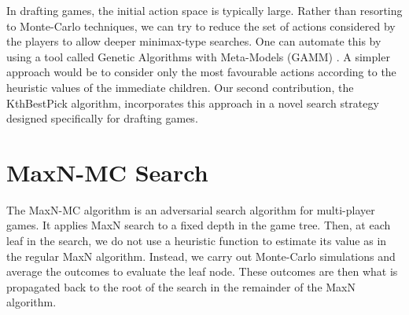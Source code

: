 \documentclass[letterpaper]{article}
\numberwithin{equation}{section}
\numberwithin{theorem}{section}
\numberwithin{lemma}{section}
\numberwithin{df}{section}
\begin{document}

In drafting games, the initial action space is typically large.  Rather than resorting to Monte-Carlo techniques, we can try to reduce the set of actions considered by the players to allow deeper minimax-type searches.  One can automate this by using a tool called Genetic Algorithms with Meta-Models (GAMM) \cite{GAMM}.  A simpler approach would be to consider only the most favourable actions according to the heuristic values of the immediate children.  Our second contribution, the KthBestPick algorithm, incorporates this approach in a novel search strategy designed specifically for drafting games.
 

%


\section{MaxN-MC Search}


The MaxN-MC algorithm is an adversarial search algorithm for multi-player games.  It applies MaxN search to a fixed depth in the game tree.  Then, at each leaf in the search, we do not use a heuristic function to estimate its value as in the regular MaxN algorithm.  Instead, we carry out Monte-Carlo simulations and average the outcomes to evaluate the leaf node.  These outcomes are then what is propagated back to the root of the search in the remainder of the MaxN algorithm.  

\end{document}

